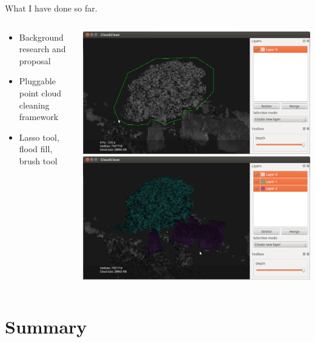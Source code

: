 \documentclass{beamer}
\begin{document}
\begin{frame}{What I have done so far.}
\begin{columns}[T]
\begin{column}{0.5\textwidth}
	\begin{itemize}
		\item Background research and proposal
		\item Pluggable point cloud cleaning framework
		\item Lasso tool, flood fill, brush tool
	\end{itemize}
\end{column}
\begin{column}{0.5\textwidth}
\centering
\includegraphics[height=0.30\textheight]{pics/app2.png}
\\
\includegraphics[height=0.30\textheight]{pics/app4.png}
\end{column}
\end{columns}
\end{frame}

\section*{Summary}
\end{document}
